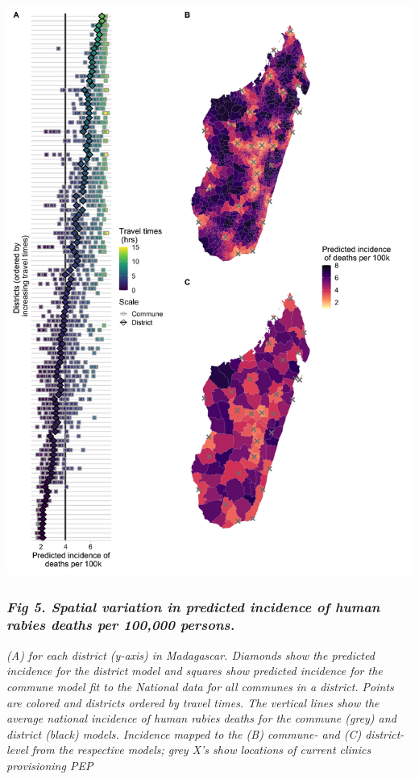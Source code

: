 \documentclass[
]{book}
\begin{document}
\includegraphics[width=0.9\linewidth]{figs/ch2/fig5}

\hypertarget{fig-5.-spatial-variation-in-predicted-incidence-of-human-rabies-deaths-per-100000-persons.}{%
\subsubsection{\texorpdfstring{\emph{Fig 5. Spatial variation in predicted incidence of human rabies deaths per 100,000 persons.}}{Fig 5. Spatial variation in predicted incidence of human rabies deaths per 100,000 persons.}}\label{fig-5.-spatial-variation-in-predicted-incidence-of-human-rabies-deaths-per-100000-persons.}}

\emph{(A) for each district (y-axis) in Madagascar. Diamonds show the
predicted incidence for the district model and squares show predicted
incidence for the commune model fit to the National data for all
communes in a district. Points are colored and districts ordered by
travel times. The vertical lines show the average national incidence of
human rabies deaths for the commune (grey) and district (black) models.
Incidence mapped to the (B) commune- and (C) district-level from the
respective models; grey X's show locations of current clinics
provisioning PEP}
\end{document}

